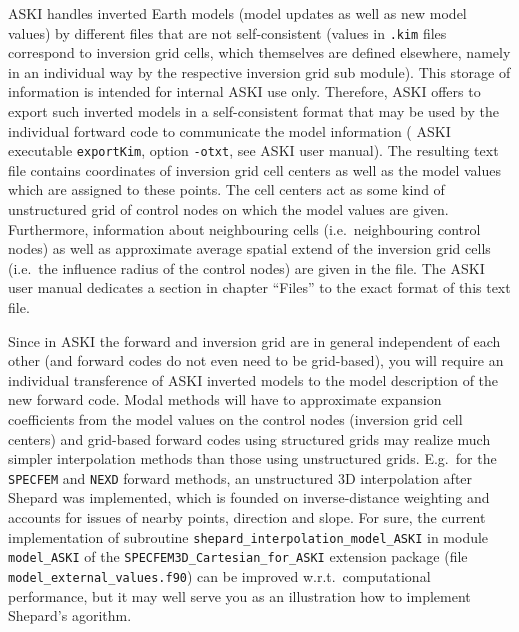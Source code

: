\documentclass[12pt,a4paper]{article}
\newcommand{\lcode}[1]{\nolinkurl{#1}}
\newcommand{\ASKI}{ {\ttfamily ASKI} }
\begin{document}
\ASKI{} handles inverted Earth models (model updates as well as new model values) by different files that are
not self-consistent (values in \lcode{.kim} files correspond to inversion grid cells, which themselves are defined
elsewhere, namely in an individual way by the respective inversion grid sub module). This storage of information
is intended for internal \ASKI{} use only. Therefore, \ASKI{} offers to export such inverted models in a 
self-consistent format that may be used by the individual fortward code to communicate the model information
(\ASKI{} executable \lcode{exportKim}, option \lcode{-otxt}, see \ASKI{} user manual). The resulting text file
contains coordinates of inversion grid cell centers as well as the model values which are assigned to these points.
The cell centers act as some kind of unstructured grid of control nodes on which the model values are given.
Furthermore, information about neighbouring cells (i.e.\ neighbouring control nodes) as well as approximate average
spatial extend of the inversion grid cells (i.e.\ the influence radius of the control nodes) are given in the file.
The \ASKI{} user manual dedicates a section in chapter ``Files'' to the exact format of this text file.

Since in \ASKI{} the forward and inversion grid are in general independent of each other (and forward codes do not
even need to be grid-based), you will require an individual transference of \ASKI{} inverted models to the model 
description of the new forward code. Modal methods will have to approximate expansion coefficients from the model
values on the control nodes (inversion grid cell centers) and grid-based forward codes using structured grids may 
realize much simpler interpolation methods than those using unstructured grids. E.g.\ for the \lcode{SPECFEM} and
\lcode{NEXD} forward methods, an unstructured 3D interpolation after Shepard \cite{Shepard68} was implemented, 
which is founded on inverse-distance weighting and accounts for issues of nearby points, direction and slope. 
For sure, the current implementation of subroutine \lcode{shepard_interpolation_model_ASKI} in module 
\lcode{model_ASKI} of the \lcode{SPECFEM3D_Cartesian_for_ASKI} extension package (file \lcode{model_external_values.f90})
can be improved w.r.t.\ computational performance, but it may well serve you as an illustration how to implement
Shepard's agorithm. 

\end{document}
